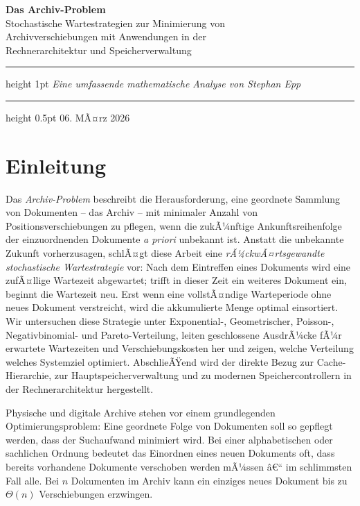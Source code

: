 ﻿\documentclass[12pt, a4paper]{article}
\begin{document}
\begin{titlepage}
  \centering
  \vspace*{2cm}
  {\LARGE\bfseries Das Archiv-Problem\\[0.4em]}
  {\large Stochastische Wartestrategien zur Minimierung von\\
          Archivverschiebungen mit Anwendungen in der\\
          Rechnerarchitektur und Speicherverwaltung\\[2.5em]}
  \hrule height 1pt
  \vspace{1.5em}
  {\large\itshape Eine umfassende mathematische Analyse von Stephan Epp\\[1em]}
  \hrule height 0.5pt
  \vfill
  {\large 06. MÃ¤rz 2026}
\end{titlepage}
\newpage

\tableofcontents
\newpage

\section{Einleitung}\label{sec:intro}
Das \emph{Archiv-Problem} beschreibt die Herausforderung, eine geordnete
Sammlung von Dokumenten -- das Archiv -- mit minimaler Anzahl von
Positionsverschiebungen zu pflegen, wenn die zukÃ¼nftige Ankunftsreihenfolge
der einzuordnenden Dokumente \emph{a priori} unbekannt ist.
Anstatt die unbekannte Zukunft vorherzusagen, schlÃ¤gt diese Arbeit eine
\emph{rÃ¼ckwÃ¤rtsgewandte stochastische Wartestrategie} vor: Nach dem Eintreffen
eines Dokuments wird eine zufÃ¤llige Wartezeit abgewartet; trifft in dieser Zeit
ein weiteres Dokument ein, beginnt die Wartezeit neu. Erst wenn eine
vollstÃ¤ndige Warteperiode ohne neues Dokument verstreicht, wird die akkumulierte
Menge optimal einsortiert. Wir untersuchen diese Strategie unter Exponential-,
Geometrischer, Poisson-, Negativbinomial- und Pareto-Verteilung, leiten
geschlossene AusdrÃ¼cke fÃ¼r erwartete Wartezeiten und Verschiebungskosten her
und zeigen, welche Verteilung welches Systemziel optimiert. AbschlieÃŸend wird
der direkte Bezug zur Cache-Hierarchie, zur Hauptspeicherverwaltung und zu
modernen Speichercontrollern in der Rechnerarchitektur hergestellt.

Physische und digitale Archive stehen vor einem grundlegenden
Optimierungsproblem: Eine geordnete Folge von Dokumenten soll so gepflegt
werden, dass der Suchaufwand minimiert wird. Bei einer alphabetischen oder
sachlichen Ordnung bedeutet das Einordnen eines neuen Dokuments oft, dass
bereits vorhandene Dokumente verschoben werden mÃ¼ssen â€“ im schlimmsten Fall
alle. Bei $n$ Dokumenten im Archiv kann ein einziges neues Dokument bis zu
$\Theta(n)$ Verschiebungen erzwingen.
\end{document}
